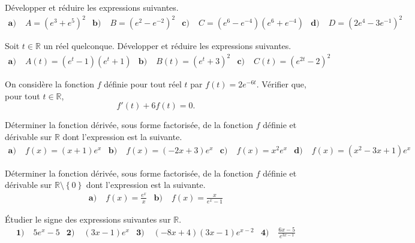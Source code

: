 \documentclass[11pt]{article}
\begin{document}
\begin{exo}
  Développer et réduire les expressions suivantes.
  \begin{align*}
    \textbf{a)}\;& A = \left( e^3+e^5 \right)^2 &
    \textbf{b)}\;& B = \left( e^2-e^{-2} \right)^2 &
    \textbf{c)}\;& C = \left( e^6-e^{-4} \right)\left( e^6+e^{-4} \right) &
    \textbf{d)}\;& D = \left( 2e^4-3e^{-1} \right)^2
  \end{align*}
\end{exo}

\begin{exo}
  Soit $t\in\mathbb{R}$ un réel quelconque. Développer et réduire les
  expressions suivantes.
  \begin{align*}
    \textbf{a)}\;& A(t) = \left( e^t-1 \right)\left( e^t+1 \right) &
    \textbf{b)}\;& B(t) = \left( e^t+3 \right)^2 &
    \textbf{c)}\;& C(t) = \left( e^{2t}-2 \right)^2
  \end{align*}
\end{exo}

\begin{exo}
  On considère la fonction $f$ définie pour tout réel $t$ par
  $f(t)=2e^{-6t}$. Vérifier que, pour tout $t\in\mathbb{R}$,
  \[
    f'(t) + 6f(t) = 0.
  \]
\end{exo}

\begin{exo}
  Déterminer la fonction dérivée, sous forme factorisée, de la fonction $f$
  définie et dérivable sur $\mathbb{R}$ dont l'expression est la suivante.
  \begin{align*}
    \textbf{a)}\;& f(x) = (x+1)e^x &
    \textbf{b)}\;& f(x) = \left( -2x+3 \right)e^x &
    \textbf{c)}\;& f(x) = x^2e^x &
    \textbf{d)}\;& f(x) = \left( x^2-3x+1 \right)e^x
  \end{align*}
\end{exo}

\begin{exo}
  Déterminer la fonction dérivée, sous forme factorisée, de la fonction $f$
  définie et dérivable sur $\mathbb{R}\setminus\left\{ 0 \right\}$ dont
  l'expression est la suivante.
  \begin{align*}
    \textbf{a)}\;& f(x) = \frac{e^x}{x} &
    \textbf{b)}\;& f(x) = \frac{x}{e^x-1}
  \end{align*}
\end{exo}

\begin{exo}
  Étudier le signe des expressions suivantes sur $\mathbb{R}$.
  \begin{align*}
    \textbf{1)}\; & 5e^x-5 &
    \textbf{2)}\; & \left( 3x-1 \right)e^x &
    \textbf{3)}\; & \left( -8x+4 \right)\left( 3x-1 \right)e^{x-2} &
    \textbf{4)}\; & \frac{6x-5}{e^{3x-1}}
  \end{align*}
\end{exo}
\end{document}
